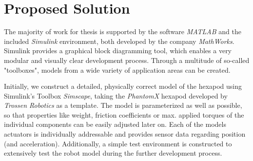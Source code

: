 \section{Proposed Solution}



The majority of work for thesis is supported by the software \textit{MATLAB\textsuperscript{\textregistered}} and the included \textit{Simulink\textsuperscript{\textregistered}} environment, both developed by the company \textit{MathWorks\textsuperscript{\textregistered}}.
Simulink provides a graphical block diagramming tool, which enables a very modular and visually clear development process.
Through a multitude of so-called "toolboxes", models from a wide variety of application areas can be created.

Initially, we construct a detailed, physically correct model of the hexapod using Simulink's Toolbox \textit{Simscape\textsuperscript{\texttrademark}}, taking the \emph{PhantomX} hexapod developed by \emph{Trossen Robotics} as a template.
The model is parameterized as well as possible, so that properties like weight, friction coefficients or max. applied torques of the individual components can be easily adjusted later on.
Each of the models actuators is individually addressable and provides sensor data regarding position (and acceleration).
Additionally, a simple test environment is constructed to extensively test the robot model during the further development process.

